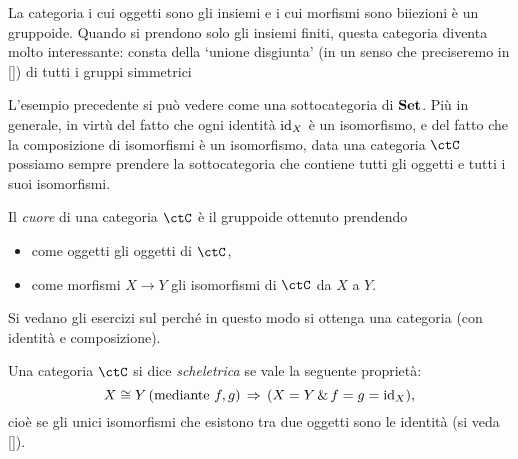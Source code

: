 \begin{example}
	La categoria i cui oggetti sono gli insiemi e i cui morfismi sono biiezioni è un gruppoide. Quando si prendono solo gli insiemi finiti, questa categoria diventa molto interessante: consta della `unione disgiunta' (in un senso che preciseremo in \ref{}) di tutti i gruppi simmetrici\Todo{}
\end{example}

L'esempio precedente si può vedere come una sottocategoria di \(\mathbf{Set}\).
Più in generale, in virtù del fatto che ogni identità \(\mathrm{id}_X\) è un isomorfismo, e del fatto che la composizione di isomorfismi è un isomorfismo, data una categoria \(\ctC\) possiamo sempre prendere la sottocategoria che contiene tutti gli oggetti e tutti i suoi isomorfismi.
\begin{definition}
	Il \emph{cuore} di una categoria \(\ctC\) è il gruppoide ottenuto prendendo
	\begin{itemize}
		\item come oggetti gli oggetti di \(\ctC\),
		\item come morfismi \(X\to Y\) gli isomorfismi di \(\ctC\) da \(X\) a \(Y\).
	\end{itemize}
\end{definition}

Si vedano gli esercizi sul perché in questo modo si ottenga una categoria (con identità e composizione).

\begin{definition}\label{def_cat_scheletrica}
	Una categoria \(\ctC\) si dice \emph{scheletrica} se vale la seguente proprietà:
	\[X\cong Y \, (\text{mediante } f,g) \,\Rightarrow\, (X=Y \,\&\, f=g=\mathrm{id}_X),\]
	cioè se gli unici isomorfismi che esistono tra due oggetti sono le identità (si veda \autoref{}).
\end{definition}
